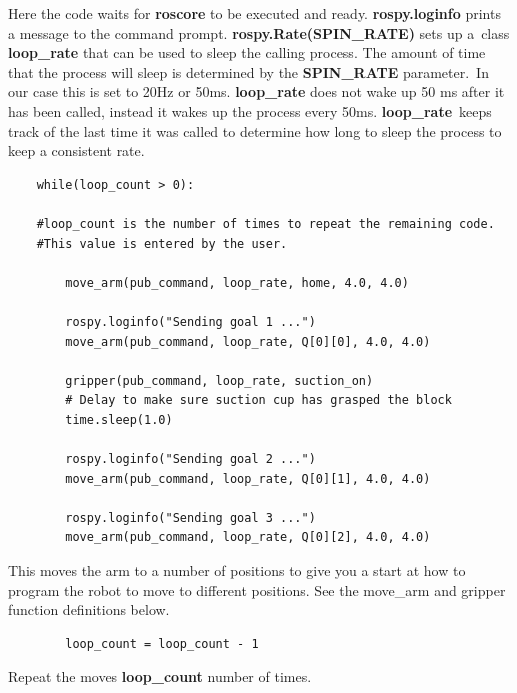 Here the code waits for \textbf{roscore} to be executed and ready.  \textbf{rospy.loginfo} prints a message to the command prompt.  \textbf{rospy.Rate(SPIN\_RATE)} sets up a\
class \textbf{loop\_rate} that can be used to sleep the calling process.  The amount of time that the process will sleep is determined by the \textbf{SPIN\_RATE} parameter.\
In our case this is set to 20Hz or 50ms.  \textbf{loop\_rate} does not wake up 50 ms after it has been called, instead it wakes up the process every 50ms.  \textbf{loop\_rate}\
keeps track of the last time it was called to determine how long to sleep the process to keep a consistent rate.    
   
{\footnotesize
\begin{verbatim}
    while(loop_count > 0):

    #loop_count is the number of times to repeat the remaining code.  
    #This value is entered by the user.

        move_arm(pub_command, loop_rate, home, 4.0, 4.0)

        rospy.loginfo("Sending goal 1 ...")
        move_arm(pub_command, loop_rate, Q[0][0], 4.0, 4.0)

        gripper(pub_command, loop_rate, suction_on)
        # Delay to make sure suction cup has grasped the block
        time.sleep(1.0)

        rospy.loginfo("Sending goal 2 ...")
        move_arm(pub_command, loop_rate, Q[0][1], 4.0, 4.0)

        rospy.loginfo("Sending goal 3 ...")
        move_arm(pub_command, loop_rate, Q[0][2], 4.0, 4.0)

\end{verbatim}}

This moves the arm to a number of positions to give you a start at how to program the robot to move to different positions.  See the move\_arm
and gripper function definitions below.

{\footnotesize
\begin{verbatim}
        loop_count = loop_count - 1
\end{verbatim}}
Repeat the moves \textbf{loop\_count} number of times.


